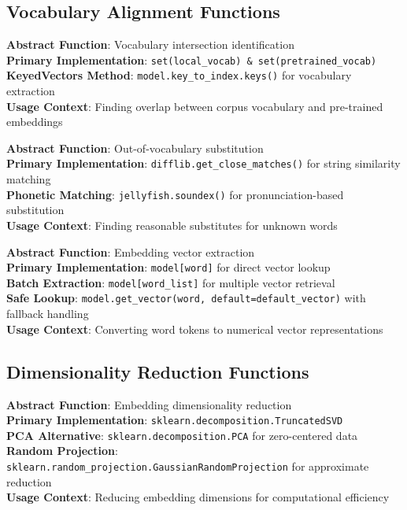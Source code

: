 \documentclass[11pt,a4paper]{article}
\begin{document}
\subsection{Vocabulary Alignment Functions}

\textbf{Abstract Function}: Vocabulary intersection identification \\
\textbf{Primary Implementation}: \texttt{set(local\_vocab) \& set(pretrained\_vocab)} \\
\textbf{KeyedVectors Method}: \texttt{model.key\_to\_index.keys()} for vocabulary extraction \\
\textbf{Usage Context}: Finding overlap between corpus vocabulary and pre-trained embeddings

\textbf{Abstract Function}: Out-of-vocabulary substitution \\
\textbf{Primary Implementation}: \texttt{difflib.get\_close\_matches()} for string similarity matching \\
\textbf{Phonetic Matching}: \texttt{jellyfish.soundex()} for pronunciation-based substitution \\
\textbf{Usage Context}: Finding reasonable substitutes for unknown words

\textbf{Abstract Function}: Embedding vector extraction \\
\textbf{Primary Implementation}: \texttt{model[word]} for direct vector lookup \\
\textbf{Batch Extraction}: \texttt{model[word\_list]} for multiple vector retrieval \\
\textbf{Safe Lookup}: \texttt{model.get\_vector(word, default=default\_vector)} with fallback handling \\
\textbf{Usage Context}: Converting word tokens to numerical vector representations

\subsection{Dimensionality Reduction Functions}

\textbf{Abstract Function}: Embedding dimensionality reduction \\
\textbf{Primary Implementation}: \texttt{sklearn.decomposition.TruncatedSVD} \\
\textbf{PCA Alternative}: \texttt{sklearn.decomposition.PCA} for zero-centered data \\
\textbf{Random Projection}: \texttt{sklearn.random\_projection.GaussianRandomProjection} for approximate reduction \\
\textbf{Usage Context}: Reducing embedding dimensions for computational efficiency
\end{document}
